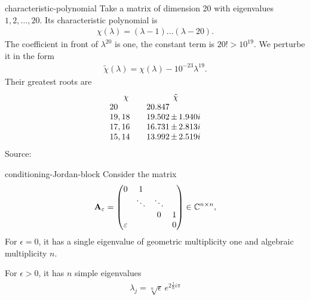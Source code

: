 \begin{Example}{characteristic-polynomial}
  Take a matrix of dimension 20 with eigenvalues $1,2,\ldots,20$. Its
  characteristic polynomial is
  \begin{gather}
    \chi(\lambda) = (\lambda-1)\dots(\lambda-20).
  \end{gather}
  The coefficient in front of $\lambda^{20}$ is one, the constant term is $20! > 10^{19}$.
  We perturbe it in the form
  \begin{gather}
    \tilde \chi(\lambda) = \chi(\lambda) - 10^{-23}\lambda^{19}.
  \end{gather}
  Their greatest roots are
  \begin{gather}
    \begin{array}{l@{\qquad}l@{\,}c@{\,}l}
      \multicolumn{1}{c}{\chi}&
      \multicolumn{3}{c}{\tilde \chi}\\
      20&20.847\\
      19,18&19.502&\pm&1.940i\\
      17,16&16.731&\pm&2.813i\\
      15,14&13.992&\pm&2.519i\\
    \end{array}
  \end{gather}
  {\tiny Source: \cite{DeuflhardHohmann08}}
\end{Example}

\begin{Example}{conditioning-Jordan-block}
  Consider the matrix
  \begin{gather}
  \mathbf A_\varepsilon =
      \begin{pmatrix}
        0&1\\
        &\ddots&\ddots\\
        &&0&1\\
        \varepsilon &&&0
      \end{pmatrix}
      \in\mathbb C^{n\times n},
  \end{gather}
  For $\epsilon=0$, it has a single eigenvalue of geometric multiplicity one and algebraic multiplicity $n$.

  For $\epsilon>0$, it has $n$ simple eigenvalues
  \begin{gather}
      \lambda_j = \sqrt[n]{\epsilon} \,e^{2\frac jni\pi}
  \end{gather}
\end{Example}

